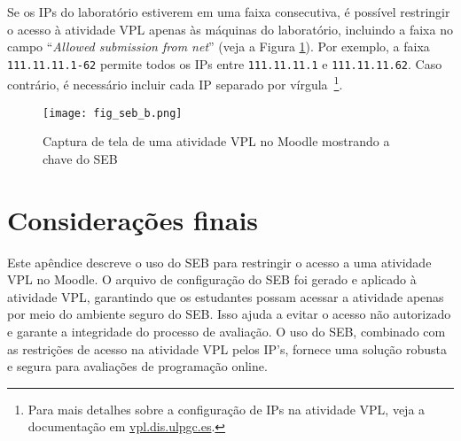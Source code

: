 Se os IPs do laboratório estiverem em uma faixa consecutiva, é possível restringir o acesso à atividade VPL apenas às máquinas do laboratório, incluindo a faixa no campo ``\textit{Allowed submission from net}'' (veja a Figura \ref{fig:fig_seb_b}). Por exemplo, a faixa \verb|111.11.11.1-62| permite todos os IPs entre \verb|111.11.11.1| e \verb|111.11.11.62|. Caso contrário, é necessário incluir cada IP separado por vírgula~\footnote{Para mais detalhes sobre a configuração de IPs na atividade VPL, veja a documentação em \href{https://vpl.dis.ulpgc.es}{vpl.dis.ulpgc.es}.}.

\begin{figure}[!ht]
\centering
\texttt{[image: fig\_seb\_b.png]}
\caption{Captura de tela de uma atividade VPL no Moodle mostrando a chave do SEB}
\label{fig:fig_seb_b}
\end{figure}


\section{Considerações finais}

Este apêndice descreve o uso do SEB para restringir o acesso a uma atividade VPL no Moodle. O arquivo de configuração do SEB foi gerado e aplicado à atividade VPL, garantindo que os estudantes possam acessar a atividade apenas por meio do ambiente seguro do SEB. Isso ajuda a evitar o acesso não autorizado e garante a integridade do processo de avaliação. O uso do SEB, combinado com as restrições de acesso na atividade VPL pelos IP's, fornece uma solução robusta e segura para avaliações de programação online.

